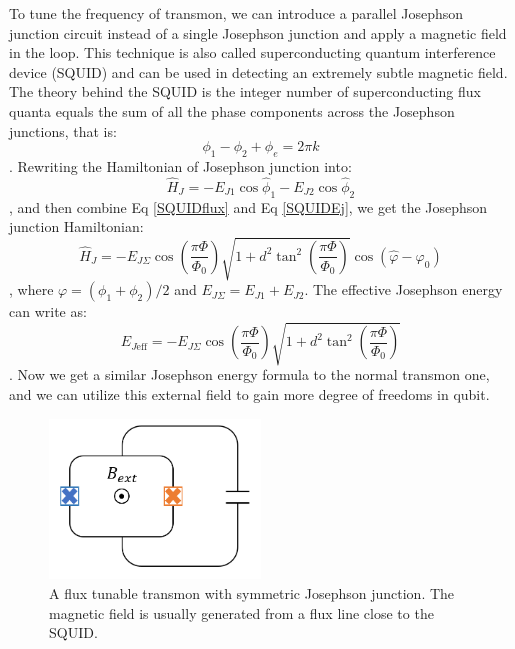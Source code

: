 To tune the frequency of transmon, we can introduce a parallel Josephson junction circuit instead of a single Josephson junction and apply a magnetic field in the loop. This technique is also called superconducting quantum interference device (SQUID) and can be used in detecting an extremely subtle magnetic field. The theory behind the SQUID is the integer number of superconducting flux quanta equals the sum of all the phase components across the Josephson junctions, that is:
\begin{equation}\label{SQUIDflux}
    \phi_1 - \phi_2 + \phi_e = 2\pi k
\end{equation}
. Rewriting the Hamiltonian of Josephson junction into\cite{RN6}:
\begin{equation}\label{SQUIDEj}
    \hat{H}_J = -E_{J1}\cos{\hat{\phi}_1} -E_{J2}\cos{\hat{\phi}_2}
\end{equation}
, and then combine Eq \ref{SQUIDflux} and Eq \ref{SQUIDEj}, we get the Josephson junction Hamiltonian:
\begin{equation}
    \hat{H}_J = -E_{J\Sigma}\cos{ \left( \frac{\pi \Phi}{\Phi_0} \right) } \sqrt{1+d^2\tan^2\left( \frac{\pi\Phi}{\Phi_0}\right)}\cos{(\hat\varphi - \varphi_0)}
\end{equation}
, where $\varphi = (\phi_1 + \phi_2) / 2$ and $E_{J\Sigma} = E_{J1} + E_{J2}$. The effective Josephson energy can write as:
\begin{equation}
    E_{J\text{eff}} = -E_{J\Sigma}\cos{ \left( \frac{\pi \Phi}{\Phi_0} \right) } \sqrt{1+d^2\tan^2\left( \frac{\pi\Phi}{\Phi_0}\right)}
\end{equation}
. Now we get a similar Josephson energy formula to the normal transmon one, and we can utilize this external field to gain more degree of freedoms in qubit.
\begin{figure}[h!]
    \centering
    \includegraphics[width=0.5\textwidth]{Pic/Fluxmon.png}
    \caption{A flux tunable transmon with symmetric Josephson junction. The magnetic field is usually generated from a flux line close to the SQUID.}
    \label{fig:my_label}
\end{figure}



